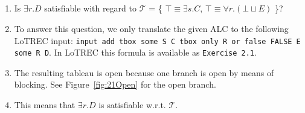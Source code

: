 \documentclass[11pt]{article} %
\begin{document}
\subsection{}


\begin{enumerate}
\item Is $\exists r.D$ satisfiable with regard to $\mathcal{T}$ = \{ $\top \equiv \exists s.C$, $\top \equiv \forall r.(\bot \sqcup E)$ \}?
\item To answer this question, we only translate the given ALC to the following LoTREC input: \texttt{input add tbox some S C tbox only R or false FALSE E some R D}. In LoTREC this formula is available as \texttt{Exercise 2.1}.
\item The resulting tableau is open because one branch is open by means of blocking. See Figure~\ref{fig:21Open} for the open branch.
\item This means that $\exists r.D$ is satisfiable w.r.t. $\mathcal{T}$.
\end{enumerate}
\end{document}
